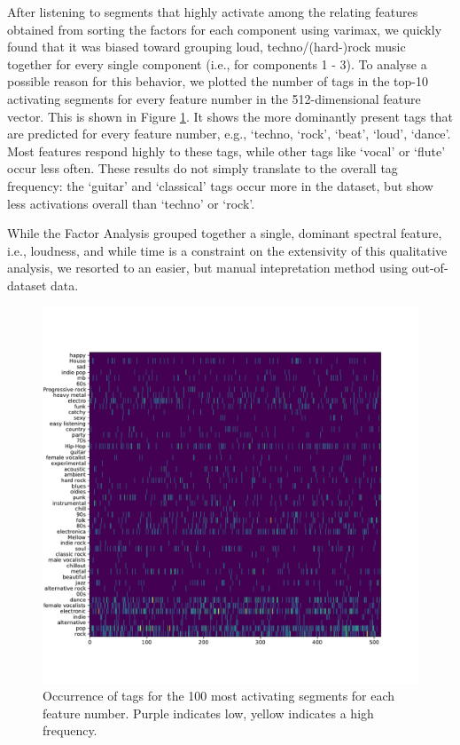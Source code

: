 After listening to segments that highly activate among the relating features obtained from sorting the factors for each component using varimax, we quickly found that it was biased toward grouping loud, techno/(hard-)rock music together for every single component (i.e., for components 1 - 3). To analyse a possible reason for this behavior, we plotted the number of tags in the top-10 activating segments for every feature number in the 512-dimensional feature vector. This is shown in Figure \ref{fig:tag_frequency}. It shows the more dominantly present tags that are predicted for every feature number, e.g., `techno, `rock', `beat', `loud', `dance'. Most features respond highly to these tags, while other tags like `vocal' or `flute' occur less often. These results do not simply translate to the overall tag frequency: the `guitar' and `classical' tags occur more in the dataset, but show less activations overall than `techno' or `rock'.

While the Factor Analysis grouped together a single, dominant spectral feature, i.e., loudness, and while time is a constraint on the extensivity of this qualitative analysis, we resorted to an easier, but manual intepretation method using out-of-dataset data.

\begin{figure}[h]
    \centering
    \includegraphics[width=\textwidth]{figs/features_tags_frequency.pdf}
    \caption{Occurrence of tags for the 100 most activating segments for each feature number. Purple indicates low, yellow indicates a high frequency.}
    \label{fig:tag_frequency}
\end{figure}


